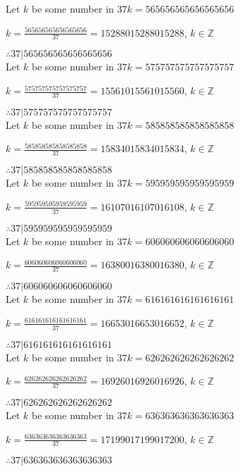 \documentclass{article}
\begin{document}
Let $k$ be some number in $37k = 565656565656565656$

$k = \frac{565656565656565656}{37} = 15288015288015288$, $k \in \mathbb{Z}$

$ \therefore  37|565656565656565656 $ \\

Let $k$ be some number in $37k = 575757575757575757$

$k = \frac{575757575757575757}{37} = 15561015561015560$, $k \in \mathbb{Z}$

$ \therefore  37|575757575757575757 $ \\

Let $k$ be some number in $37k = 585858585858585858$

$k = \frac{585858585858585858}{37} = 15834015834015834$, $k \in \mathbb{Z}$

$ \therefore  37|585858585858585858 $ \\

Let $k$ be some number in $37k = 595959595959595959$

$k = \frac{595959595959595959}{37} = 16107016107016108$, $k \in \mathbb{Z}$

$ \therefore  37|595959595959595959 $ \\

Let $k$ be some number in $37k = 606060606060606060$

$k = \frac{606060606060606060}{37} = 16380016380016380$, $k \in \mathbb{Z}$

$ \therefore  37|606060606060606060 $ \\

Let $k$ be some number in $37k = 616161616161616161$

$k = \frac{616161616161616161}{37} = 16653016653016652$, $k \in \mathbb{Z}$

$ \therefore  37|616161616161616161 $ \\

Let $k$ be some number in $37k = 626262626262626262$

$k = \frac{626262626262626262}{37} = 16926016926016926$, $k \in \mathbb{Z}$

$ \therefore  37|626262626262626262 $ \\

Let $k$ be some number in $37k = 636363636363636363$

$k = \frac{636363636363636363}{37} = 17199017199017200$, $k \in \mathbb{Z}$

$ \therefore  37|636363636363636363 $ \\
\end{document}
